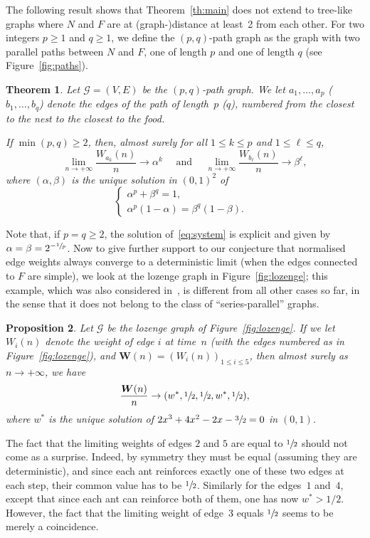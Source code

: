 \documentclass[JEP,XML,SOM,Unicode,NoFloatCountersInSection,published]{cedram}
\let\mathcal\mathscr
\let \nicefrac\sfrac
\newcommand{\bW}{\boldsymbol{W}}
\numberwithin{equation}{section}
\newtheorem{theorem}{Theorem}[section]
\newtheorem{proposition}[theorem]{Proposition}
\theoremstyle{definition}
\begin{document}
The following result shows that Theorem~\ref{th:main} does not extend to tree-like graphs where $N$ and $F$ are at (graph-)distance at least~2 from each other. For two integers $p\geq 1$ and $q\geq 1$, we define the $(p,q)$-path graph as the graph
with two parallel paths between $N$ and $F$,
one of length $p$ and one of length $q$ (see Figure~\ref{fig:paths}).

\begin{theorem}\label{th:two_paths}
Let $\mathcal G = (V,E)$ be the $(p,q)$-path graph.
We let $a_1, \ldots, a_p$ (\resp $b_1, \ldots, b_q$) denote the edges of the path of length~$p$ (\resp $q$), numbered from the closest to the nest to the closest to the food.

If $\min(p,q)\geq 2$, then, almost surely for all $1\leq k\leq p$ and $1\leq\ell\leq q$,
\[
\lim_{n\to+\infty} \frac{W_{a_k}(n)}n \to \alpha^k
\quad \text{ and }\quad
\lim_{n\to+\infty} \frac{W_{b_\ell}(n)}n \to \beta^\ell,
\]
where $(\alpha, \beta)$ is the unique solution in $(0,1)^2$ of
\begin{equation}\label{eq:system}
\begin{cases}
\alpha^p+\beta^q = 1,&\\
\alpha^p(1-\alpha) =\beta^q(1-\beta).
\end{cases}
\end{equation}
\end{theorem}

Note that, if $p=q\geq 2$, the solution of~\eqref{eq:system}
is explicit and given by $\alpha = \beta = 2^{-\nicefrac1p}$. Now to give further support to our conjecture that normalised edge weights always converge to a deterministic limit (when the edges connected to $F$ are simple), we look at the lozenge graph in Figure~\ref{fig:lozenge}; this example, which was also considered in~\cite{KMS},
is different from all other cases so far, in the sense that it does not belong to the class of ``series-parallel'' graphs.
\begin{proposition}\label{prop:lozenge}
Let $\mathcal G$ be the lozenge graph of Figure~\ref{fig:lozenge}. If we let $W_i(n)$ denote the weight of edge $i$ at time~$n$ (with the edges numbered as in Figure~\ref{fig:lozenge}), and $\bW(n) = (W_i(n))_{1\leq i\leq 5}$, then almost surely as $n\to+\infty$, we have
\[
\frac{\bW(n)}{n} \to (w^*, \nicefrac12, \nicefrac12, w^*, \nicefrac12),
\]
where $w^*$ is the unique solution of $2x^3+4x^2-2x-\nicefrac32 = 0$ in $(0,1)$.
\end{proposition}
{The fact that the limiting weights of edges $2$ and $5$ are equal to $\nicefrac12$ should not come as a surprise. Indeed, by symmetry they must be equal (assuming they are deterministic),
and since each ant reinforces exactly one of these two edges at each step, their common value has to be $\nicefrac12$.
Similarly for the edges~$1$ and~$4$, except that since each ant can reinforce both of them,
one has now $w^*>1/2$.
However, the fact that the limiting weight of edge~$3$ equals $\nicefrac12$ seems to be merely a coincidence.}
\end{document}
